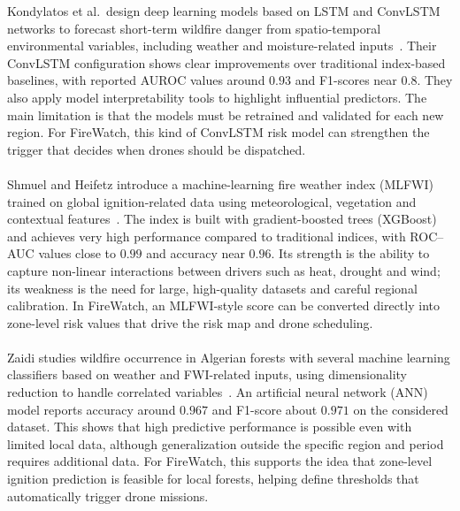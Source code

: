 \documentclass[11pt,a4paper]{report}
\begin{document}
Kondylatos et al.\ design deep learning models based on LSTM and ConvLSTM networks to forecast short-term wildfire danger from spatio-temporal environmental variables, including weather and moisture-related inputs~\cite{kondylatos2022}. Their ConvLSTM configuration shows clear improvements over traditional index-based baselines, with reported AUROC values around $0.93$ and F1-scores near $0.8$. They also apply model interpretability tools to highlight influential predictors. The main limitation is that the models must be retrained and validated for each new region. For FireWatch, this kind of ConvLSTM risk model can strengthen the trigger that decides when drones should be dispatched.
\\  \\ 
Shmuel and Heifetz introduce a machine-learning fire weather index (MLFWI) trained on global ignition-related data using meteorological, vegetation and contextual features~\cite{shmuel2023}. The index is built with gradient-boosted trees (XGBoost) and achieves very high performance compared to traditional indices, with ROC--AUC values close to $0.99$ and accuracy near $0.96$. Its strength is the ability to capture non-linear interactions between drivers such as heat, drought and wind; its weakness is the need for large, high-quality datasets and careful regional calibration. In FireWatch, an MLFWI-style score can be converted directly into zone-level risk values that drive the risk map and drone scheduling.
\\ \\ 
Zaidi studies wildfire occurrence in Algerian forests with several machine learning classifiers based on weather and FWI-related inputs, using dimensionality reduction to handle correlated variables~\cite{zaidi2023}. An artificial neural network (ANN) model reports accuracy around $0.967$ and F1-score about $0.971$ on the considered dataset. This shows that high predictive performance is possible even with limited local data, although generalization outside the specific region and period requires additional data. For FireWatch, this supports the idea that zone-level ignition prediction is feasible for local forests, helping define thresholds that automatically trigger drone missions.
\end{document}
